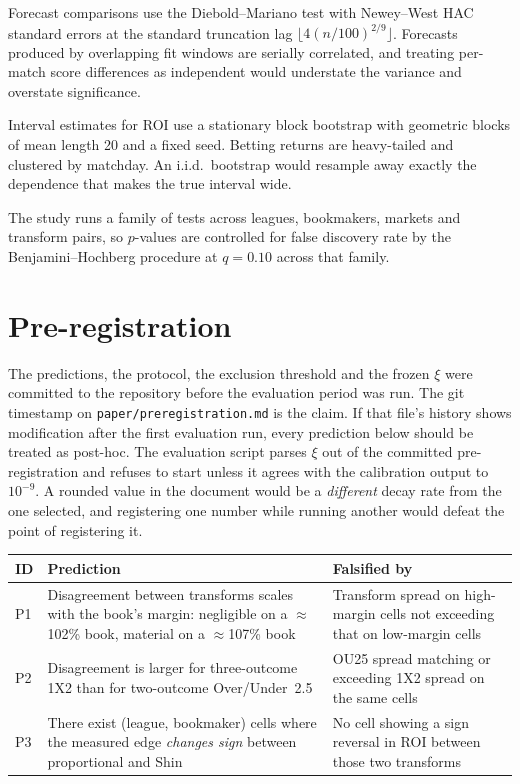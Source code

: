 \documentclass[11pt,a4paper]{article}
\begin{document}
Forecast comparisons use the Diebold--Mariano test \citep{diebold1995} with
Newey--West HAC standard errors \citep{newey1987} at the standard truncation
lag $\lfloor 4(n/100)^{2/9} \rfloor$. Forecasts produced by overlapping fit
windows are serially correlated, and treating per-match score differences as
independent would understate the variance and overstate significance.

Interval estimates for ROI use a stationary block bootstrap
\citep{politis1994} with geometric blocks of mean length 20 and a fixed seed.
Betting returns are heavy-tailed and clustered by matchday. An i.i.d.\
bootstrap would resample away exactly the dependence that makes the true
interval wide.

The study runs a family of tests across leagues, bookmakers, markets and
transform pairs, so $p$-values are controlled for false discovery rate by the
Benjamini--Hochberg procedure \citep{benjamini1995} at $q = 0.10$ across that
family.

\section{Pre-registration}
\label{sec:prereg}

The predictions, the protocol, the exclusion threshold and the frozen $\xi$
were committed to the repository before the evaluation period was run. The git
timestamp on \texttt{paper/\allowbreak preregistration.md} is the claim. If that file's
history shows modification after the first evaluation run, every prediction
below should be treated as post-hoc. The evaluation script parses $\xi$ out of
the committed pre-registration and refuses to start unless it agrees with the
calibration output to $10^{-9}$. A rounded value in the document would be a
\emph{different} decay rate from the one selected, and registering one number
while running another would defeat the point of registering it.

\begin{center}
\begin{tabular}{p{}p{}p{}}
  \toprule
  ID & Prediction & Falsified by \\
  \midrule
  P1 & Disagreement between transforms scales with the book's margin:
       negligible on a $\approx$102\% book, material on a $\approx$107\% book &
       Transform spread on high-margin cells not exceeding that on low-margin
       cells \\
  P2 & Disagreement is larger for three-outcome 1X2 than for two-outcome
       Over/Under~2.5 &
       OU25 spread matching or exceeding 1X2 spread on the same cells \\
  P3 & There exist (league, bookmaker) cells where the measured edge
       \emph{changes sign} between proportional and Shin &
       No cell showing a sign reversal in ROI between those two transforms \\
  \bottomrule
\end{tabular}
\end{center}
\end{document}
